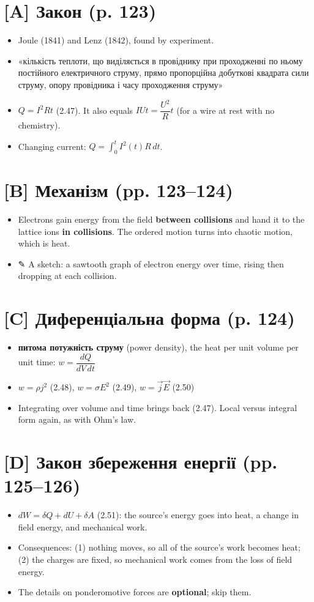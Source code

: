 \documentclass[11pt,a4paper,oneside]{book}
\newcommand{\pen}{{\sffamily\color{accent}✎}}
\begin{document}
\section*{[A] Закон (p. 123)}
\begin{itemize}
\item Joule (1841) and Lenz (1842), found by experiment.
\item «кількість теплоти, що виділяється в провіднику при проходженні по ньому постійного електричного струму, прямо пропорційна добуткові квадрата сили струму, опору провідника і часу проходження струму»
\item $Q = I^2Rt$ (2.47). It also equals $IUt = \dfrac{U^2}{R}t$ (for a wire at rest with no chemistry).
\item Changing current: $Q = \int_0^t I^2(t)R\,dt$.
\end{itemize}

\section*{[B] Механізм (pp. 123–124)}
\begin{itemize}
\item Electrons gain energy from the field \textbf{between collisions} and hand it to the lattice ions \textbf{in collisions}. The ordered motion turns into chaotic motion, which is heat.
\item \pen{} A sketch: a sawtooth graph of electron energy over time, rising then dropping at each collision.
\end{itemize}

\section*{[C] Диференціальна форма (p. 124)}
\begin{itemize}
\item \textbf{питома потужність струму} (power density), the heat per unit volume per unit time: $w = \dfrac{dQ}{dV\,dt}$
\item $w = \rho j^2$ (2.48), $w = \sigma E^2$ (2.49), $w = \vec j\vec E$ (2.50)
\item Integrating over volume and time brings back (2.47). Local versus integral form again, as with Ohm's law.
\end{itemize}

\section*{[D] Закон збереження енергії (pp. 125–126)}
\begin{itemize}
\item $dW = \delta Q + dU + \delta A$ (2.51): the source's energy goes into heat, a change in field energy, and mechanical work.
\item Consequences: (1) nothing moves, so all of the source's work becomes heat; (2) the charges are fixed, so mechanical work comes from the loss of field energy.
\item The details on ponderomotive forces are \textbf{optional}; skip them.
\end{itemize}
\end{document}
